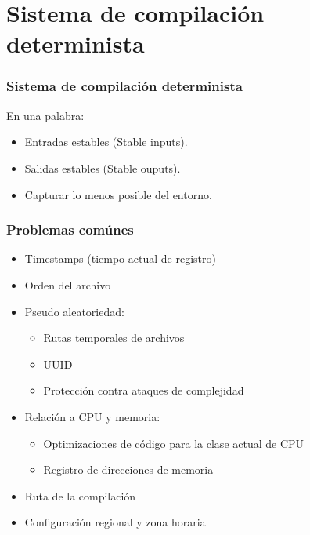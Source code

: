 \documentclass[14pt,aspectratio=169]{beamer}
\begin{document}
\section{Sistema de compilación determinista}

\begin{frame}
\frametitle{Sistema de compilación determinista}

En una palabra:

\begin{itemize}
\item Entradas estables (Stable inputs).
\item Salidas estables (Stable ouputs).
\item Capturar lo menos posible del entorno.
\end{itemize}
\end{frame}

\begin{frame}
 \frametitle{Problemas comúnes}

 \begin{itemize}
  \item Timestamps (tiempo actual de registro)
  \item Orden del archivo
  \item Pseudo aleatoriedad:
   \begin{itemize}
    \item Rutas temporales de archivos
    \item UUID
    \item Protección contra ataques de complejidad
   \end{itemize}
  \item Relación a CPU y memoria:
   \begin{itemize}
    \item Optimizaciones de código para la clase actual de CPU
    \item Registro de direcciones de memoria
   \end{itemize}
  \item Ruta de la compilación
  \item Configuración regional y zona horaria
 \end{itemize}
\end{frame}
\end{document}
